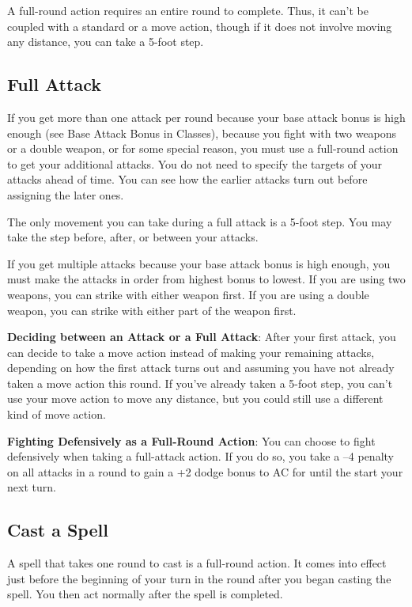 				
A full-round action requires an entire round to complete. Thus, it can't be coupled with a standard or a move action, though if it does not involve moving any distance, you can take a 5-foot step.
				
\subsection{Full Attack}

				
If you get more than one attack per round because your base attack bonus is high enough (see Base Attack Bonus in Classes), because you fight with two weapons or a double weapon, or for some special reason, you must use a full-round action to get your additional attacks. You do not need to specify the targets of your attacks ahead of time. You can see how the earlier attacks turn out before assigning the later ones.
				
The only movement you can take during a full attack is a 5-foot step. You may take the step before, after, or between your attacks.
				
If you get multiple attacks because your base attack bonus is high enough, you must make the attacks in order from highest bonus to lowest. If you are using two weapons, you can strike with either weapon first. If you are using a double weapon, you can strike with either part of the weapon first.
				
\textbf{Deciding between an Attack or a Full Attack}: After your first attack, you can decide to take a move action instead of making your remaining attacks, depending on how the first attack turns out and assuming you have not already taken a move action this round. If you've already taken a 5-foot step, you can't use your move action to move any distance, but you could still use a different kind of move action.
				
\textbf{Fighting Defensively as a Full-Round Action}: You can choose to fight defensively when taking a full-attack action. If you do so, you take a --4 penalty on all attacks in a round to gain a +2 dodge bonus to AC for until the start your next turn.
				
\subsection{Cast a Spell}

				
A spell that takes one round to cast is a full-round action. It comes into effect just before the beginning of your turn in the round after you began casting the spell. You then act normally after the spell is completed.
				
